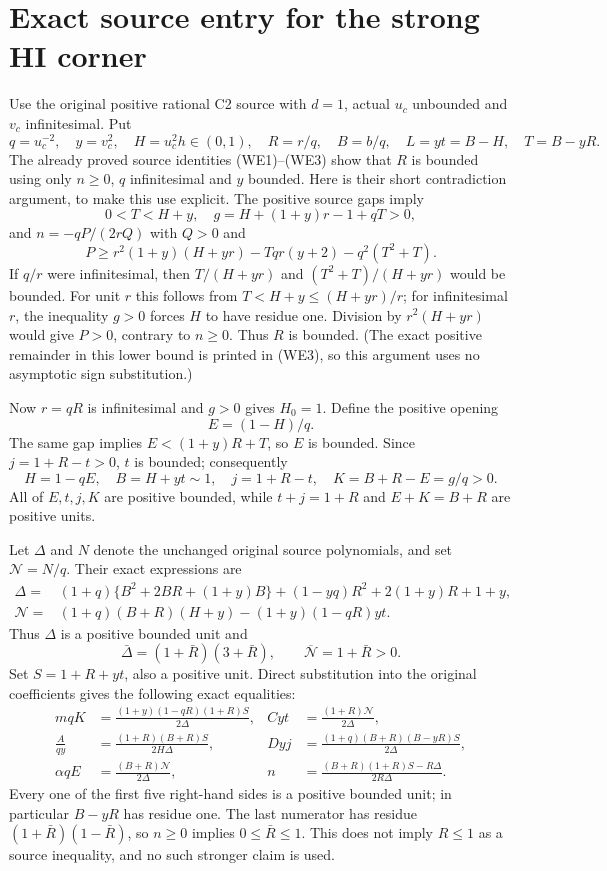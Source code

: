 \section{Exact source entry for the strong HI corner}
Use the original positive rational C2 source with $d=1$, actual
$u_c$ unbounded and $v_c$ infinitesimal. Put
\[
 q=u_c^{-2},\quad y=v_c^2,\quad H=u_c^2h\in(0,1),
 \quad R=r/q,\quad B=b/q,\quad L=yt=B-H,\quad T=B-yR.
\]
The already proved source identities (WE1)--(WE3) show that $R$ is
bounded using only $n\geq0$, $q$ infinitesimal and $y$ bounded.
Here is their short contradiction argument, to make this use
explicit. The positive source gaps imply
\[
 0<T<H+y,\quad g=H+(1+y)r-1+qT>0,
\]
and $n=-qP/(2rQ)$ with $Q>0$ and
\[
 P\ge r^2(1+y)(H+yr)-Tqr(y+2)-q^2(T^2+T).
\]
If $q/r$ were infinitesimal, then $T/(H+yr)$ and
$(T^2+T)/(H+yr)$ would be bounded. For unit $r$ this follows
from $T<H+y\le(H+yr)/r$; for infinitesimal $r$, the inequality
$g>0$ forces $H$ to have residue one. Division by $r^2(H+yr)$
would give $P>0$, contrary to $n\geq0$. Thus $R$ is bounded.
(The exact positive remainder in this lower bound is printed in
(WE3), so this argument uses no asymptotic sign substitution.)

Now $r=qR$ is infinitesimal and $g>0$ gives $H_0=1$.
Define the positive opening
\[
 E=(1-H)/q.
\]
The same gap implies
$E<(1+y)R+T$, so $E$ is bounded. Since $j=1+R-t>0$,
$t$ is bounded; consequently
\[
 H=1-qE,\quad B=H+yt\sim1,\quad
 j=1+R-t,\quad K=B+R-E=g/q>0.
\]
All of $E,t,j,K$ are positive bounded, while
$t+j=1+R$ and $E+K=B+R$ are positive units.

Let $\Delta$ and $N$ denote the unchanged original source
polynomials, and set $\mathcal N=N/q$. Their exact expressions are
\begin{align*}
\Delta={}&(1+q)\{B^2+2BR+(1+y)B\}
 +(1-yq)R^2+2(1+y)R+1+y,\\
\mathcal N={}&(1+q)(B+R)(H+y)-(1+y)(1-qR)yt.
\end{align*}
Thus $\Delta$ is a positive bounded unit and
\[
 \bar\Delta=(1+\bar R)(3+\bar R),\qquad
 \overline{\mathcal N}=1+\bar R>0.
\]
Set $S=1+R+yt$, also a positive unit. Direct substitution into
the original coefficients gives the following exact equalities:
\[
\begin{aligned}
 mqK&=\frac{(1+y)(1-qR)(1+R)S}{2\Delta},&
 Cyt&=\frac{(1+R)\mathcal N}{2\Delta},\\
 \frac{A}{qy}&=\frac{(1+R)(B+R)S}{2H\Delta},&
 Dyj&=\frac{(1+q)(B+R)(B-yR)S}{2\Delta},\\
 \alpha qE&=\frac{(B+R)\mathcal N}{2\Delta},&
 n&=\frac{(B+R)(1+R)S-R\Delta}{2R\Delta}.
\end{aligned}                                                   \tag{HI-entry}
\]
Every one of the first five right-hand sides is a positive bounded
unit; in particular $B-yR$ has residue one. The last numerator has
residue $(1+\bar R)(1-\bar R)$, so $n\geq0$ implies
$0\le\bar R\le1$. This does not imply $R\le1$ as a source
inequality, and no such stronger claim is used.

